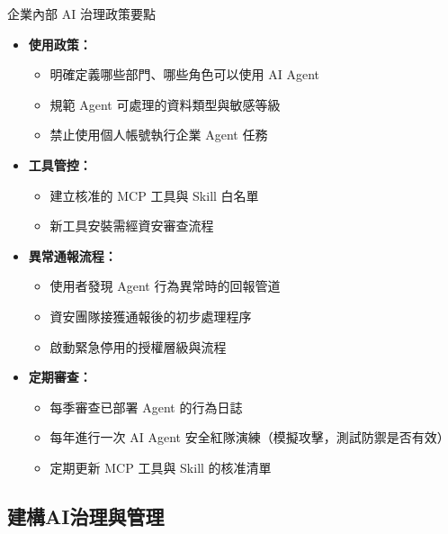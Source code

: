 \documentclass[aspectratio=1610]{Common/MyCourseBeamer}
\begin{document}
\begin{frame}[allowframebreaks=0.85]{企業內部 AI 治理政策要點}

	\begin{itemize}
		\item \textbf{使用政策：}
			\begin{itemize}
				\item 明確定義哪些部門、哪些角色可以使用 AI Agent
				\item 規範 Agent 可處理的資料類型與敏感等級
				\item 禁止使用個人帳號執行企業 Agent 任務
			\end{itemize}

		\item \textbf{工具管控：}
			\begin{itemize}
				\item 建立核准的 MCP 工具與 Skill 白名單
				\item 新工具安裝需經資安審查流程
			\end{itemize}

		\framebreak
		\item \textbf{異常通報流程：}
			\begin{itemize}
				\item 使用者發現 Agent 行為異常時的回報管道
				\item 資安團隊接獲通報後的初步處理程序
				\item 啟動緊急停用的授權層級與流程
			\end{itemize}

		\item \textbf{定期審查：}
			\begin{itemize}
				\item 每季審查已部署 Agent 的行為日誌
				\item 每年進行一次 AI Agent 安全紅隊演練（模擬攻擊，測試防禦是否有效）
				\item 定期更新 MCP 工具與 Skill 的核准清單
			\end{itemize}
	\end{itemize}

\end{frame}

\subsection{建構AI治理與管理}
\end{document}
